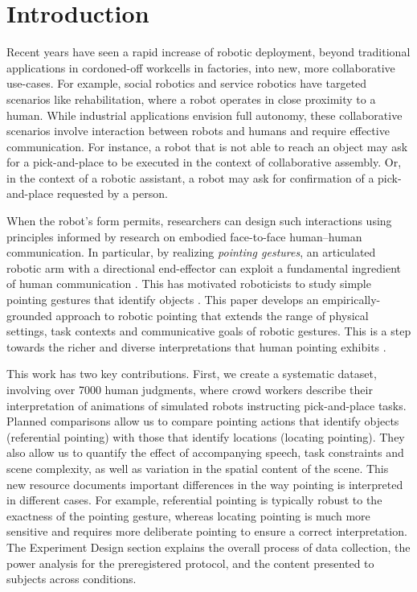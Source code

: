 \section{Introduction}
\label{intro}

Recent years have seen a rapid increase of robotic deployment, beyond traditional applications in cordoned-off workcells in factories, into new, more collaborative use-cases. For example, social robotics and service robotics have targeted scenarios like rehabilitation, where a robot operates in close proximity to a human. While industrial applications envision full autonomy, these collaborative scenarios involve interaction between robots and humans and require effective communication. For instance, a robot that is not able to reach an object may ask for a pick-and-place to be executed in the context of collaborative assembly. Or, in the context of a robotic assistant, a robot may ask for confirmation of a pick-and-place requested by a person.

When the robot's form permits, researchers can design such interactions using principles informed by research on embodied face-to-face human--human communication.  In particular, by realizing \emph{pointing gestures}, an articulated robotic arm with a directional end-effector can exploit a fundamental ingredient of human communication \cite{kita2003pointing}.  This has motivated roboticists to study simple pointing gestures that identify objects \cite{han2018placing,holladay2014legible,zhao2016experimental}.   This paper develops an empirically-grounded approach to robotic pointing that extends the range of physical settings, task contexts and communicative goals of robotic gestures. This is a step towards the richer and diverse interpretations that human pointing exhibits \cite{kendon:2004}.


This work has two key contributions.  First, we create a systematic dataset, involving over 7000 human judgments, where crowd workers describe their interpretation of animations of simulated robots instructing pick-and-place tasks.  Planned comparisons allow us to compare pointing actions that identify objects (referential pointing) with those that identify locations (locating pointing). They also allow us to quantify the effect of accompanying speech, task constraints and scene complexity, as well as variation in the spatial content of the scene.  This new resource documents important differences in the way pointing is interpreted in different cases.  For example, referential pointing is typically robust to the exactness of the pointing gesture, whereas locating pointing is much more sensitive and requires more deliberate pointing to ensure a correct interpretation.  The Experiment Design section explains the overall process of data collection, the power analysis for the preregistered protocol, and the content presented to subjects across conditions. 


